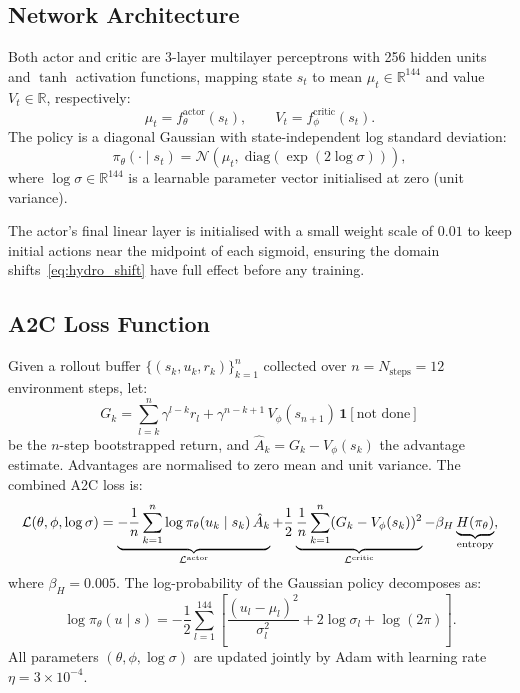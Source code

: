 \documentclass[11pt,letterpaper]{article}
\newcommand{\R}{\mathbb{R}}
\newcommand{\diag}{\mathrm{diag}}
\begin{document}
\subsection{Network Architecture}

Both actor and critic are 3-layer multilayer perceptrons with 256 hidden units
and $\tanh$ activation functions, mapping state $s_t$ to mean $\mu_t \in \R^{144}$
and value $V_t \in \R$, respectively:
\begin{equation}
  \mu_t = f^{\mathrm{actor}}_\theta(s_t), \qquad
  V_t   = f^{\mathrm{critic}}_\phi(s_t).
\end{equation}
The policy is a diagonal Gaussian with state-independent log standard deviation:
\begin{equation}
  \pi_\theta(\cdot \mid s_t) = \mathcal{N}(\mu_t,\; \diag(\exp(2\log\sigma))),
  \label{eq:policy}
\end{equation}
where $\log\sigma \in \R^{144}$ is a learnable parameter vector initialised at
zero (unit variance).

The actor's final linear layer is initialised with a small weight scale of $0.01$
to keep initial actions near the midpoint of each sigmoid, ensuring the domain
shifts~\eqref{eq:hydro_shift} have full effect before any training.

\subsection{A2C Loss Function}

Given a rollout buffer $\{(s_k, u_k, r_k)\}_{k=1}^n$ collected over $n =
N_{\mathrm{steps}} = 12$ environment steps, let:
\begin{equation}
  G_k = \sum_{l=k}^{n} \gamma^{l-k} r_l + \gamma^{n-k+1}\, V_\phi(s_{n+1})\,
        \mathbf{1}[\text{not done}]
  \label{eq:returns}
\end{equation}
be the $n$-step bootstrapped return, and $\hat{A}_k = G_k - V_\phi(s_k)$
the advantage estimate.  Advantages are normalised to zero mean and unit variance.
The combined A2C loss is:
\begin{equation}
  \mathcal{L}(\theta,\phi,\log\sigma) =
  \underbrace{-\frac{1}{n}\sum_{k=1}^{n} \log\pi_\theta(u_k \mid s_k)\,\hat{A}_k}_{%
    \mathcal{L}^{\mathrm{actor}}}
  + \frac{1}{2}\underbrace{\frac{1}{n}\sum_{k=1}^{n}(G_k - V_\phi(s_k))^2}_{%
    \mathcal{L}^{\mathrm{critic}}}
  - \beta_H\underbrace{H(\pi_\theta)}_{\text{entropy}},
  \label{eq:a2c_loss}
\end{equation}
where $\beta_H = 0.005$.
The log-probability of the Gaussian policy decomposes as:
\begin{equation}
  \log\pi_\theta(u \mid s) =
  -\frac{1}{2}\sum_{l=1}^{144}\!\left[
  \frac{(u_l - \mu_l)^2}{\sigma_l^2} + 2\log\sigma_l + \log(2\pi)
  \right].
\end{equation}
All parameters $(\theta, \phi, \log\sigma)$ are updated jointly by Adam with
learning rate $\eta = 3\times 10^{-4}$.
\end{document}
